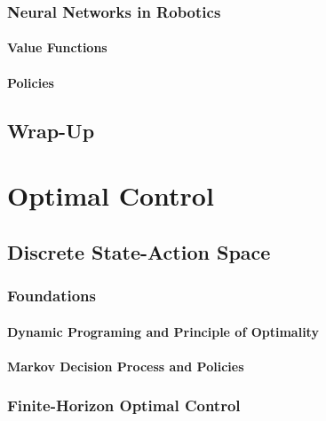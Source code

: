 		\subsection{Neural Networks in Robotics} %

			\subsubsection{Value Functions} %

			\subsubsection{Policies} %

	\section{Wrap-Up} %

\chapter{Optimal Control} %

	\section{Discrete State-Action Space} %

		\subsection{Foundations} %

			\subsubsection{Dynamic Programing and Principle of Optimality} %

			\subsubsection{Markov Decision Process and Policies} %

		\subsection{Finite-Horizon Optimal Control} %

